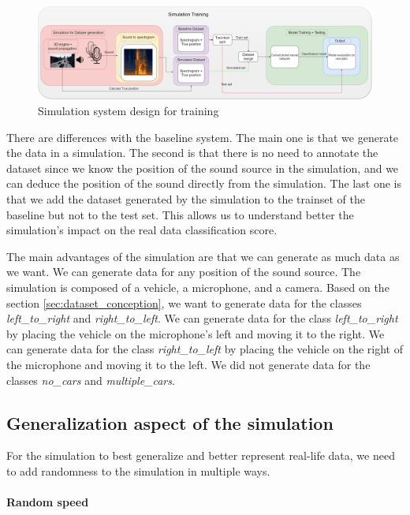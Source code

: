 \begin{figure}[H]
    \centering
    \includegraphics[width=1\textwidth]{../Images/simulation_training_design.drawio.png}
    \caption{Simulation system design for training}
    \label{fig:simulation_system_design.drawio}
\end{figure}

There are differences with the baseline system. The main one is that we generate the data in a simulation. The second is that there is no need to annotate the dataset since we know the position of the sound source in the simulation, and we can deduce the position of the sound directly from the simulation. The last one is that we add the dataset generated by the simulation to the trainset of the baseline but not to the test set. This allows us to understand better the simulation's impact on the real data classification score.

The main advantages of the simulation are that we can generate as much data as we want. We can generate data for any position of the sound source. The simulation is composed of a vehicle, a microphone, and a camera. Based on the section \ref{sec:dataset_conception}, we want to generate data for the classes \textit{left\_to\_right} and \textit{right\_to\_left}. We can generate data for the class \textit{left\_to\_right} by placing the vehicle on the microphone's left and moving it to the right. We can generate data for the class \textit{right\_to\_left} by placing the vehicle on the right of the microphone and moving it to the left. We did not generate data for the classes \textit{no\_cars} and \textit{multiple\_cars}.

\subsection{Generalization aspect of the simulation} %

For the simulation to best generalize and better represent real-life data, we need to add randomness to the simulation in multiple ways. 

\paragraph{Random speed}

